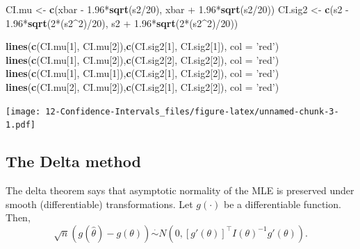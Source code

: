 \documentclass[]{book}
\newenvironment{Shaded}{\begin{snugshade}}{\end{snugshade}}
\newcommand{\KeywordTok}[1]{\textcolor[rgb]{0.13,0.29,0.53}{\textbf{{#1}}}}
\newcommand{\DataTypeTok}[1]{\textcolor[rgb]{0.13,0.29,0.53}{{#1}}}
\newcommand{\DecValTok}[1]{\textcolor[rgb]{0.00,0.00,0.81}{{#1}}}
\newcommand{\FloatTok}[1]{\textcolor[rgb]{0.00,0.00,0.81}{{#1}}}
\newcommand{\StringTok}[1]{\textcolor[rgb]{0.31,0.60,0.02}{{#1}}}
\newcommand{\NormalTok}[1]{{#1}}
\begin{document}
\begin{Shaded}
\begin{Highlighting}[]
\NormalTok{CI.mu <-}\StringTok{ }\KeywordTok{c}\NormalTok{(xbar -}\StringTok{ }\FloatTok{1.96}\NormalTok{*}\KeywordTok{sqrt}\NormalTok{(s2/}\DecValTok{20}\NormalTok{), xbar +}\StringTok{ }\FloatTok{1.96}\NormalTok{*}\KeywordTok{sqrt}\NormalTok{(s2/}\DecValTok{20}\NormalTok{))}
\NormalTok{CI.sig2 <-}\StringTok{ }\KeywordTok{c}\NormalTok{(s2 -}\StringTok{ }\FloatTok{1.96}\NormalTok{*}\KeywordTok{sqrt}\NormalTok{(}\DecValTok{2}\NormalTok{*(s2^}\DecValTok{2}\NormalTok{)/}\DecValTok{20}\NormalTok{), s2 +}\StringTok{ }\FloatTok{1.96}\NormalTok{*}\KeywordTok{sqrt}\NormalTok{(}\DecValTok{2}\NormalTok{*(s2^}\DecValTok{2}\NormalTok{)/}\DecValTok{20}\NormalTok{))}

\KeywordTok{lines}\NormalTok{(}\KeywordTok{c}\NormalTok{(CI.mu[}\DecValTok{1}\NormalTok{], CI.mu[}\DecValTok{2}\NormalTok{]),}\KeywordTok{c}\NormalTok{(CI.sig2[}\DecValTok{1}\NormalTok{], CI.sig2[}\DecValTok{1}\NormalTok{]), }\DataTypeTok{col =} \StringTok{'red'}\NormalTok{) }
\KeywordTok{lines}\NormalTok{(}\KeywordTok{c}\NormalTok{(CI.mu[}\DecValTok{1}\NormalTok{], CI.mu[}\DecValTok{2}\NormalTok{]),}\KeywordTok{c}\NormalTok{(CI.sig2[}\DecValTok{2}\NormalTok{], CI.sig2[}\DecValTok{2}\NormalTok{]), }\DataTypeTok{col =} \StringTok{'red'}\NormalTok{) }
\KeywordTok{lines}\NormalTok{(}\KeywordTok{c}\NormalTok{(CI.mu[}\DecValTok{1}\NormalTok{], CI.mu[}\DecValTok{1}\NormalTok{]),}\KeywordTok{c}\NormalTok{(CI.sig2[}\DecValTok{1}\NormalTok{], CI.sig2[}\DecValTok{2}\NormalTok{]), }\DataTypeTok{col =} \StringTok{'red'}\NormalTok{) }
\KeywordTok{lines}\NormalTok{(}\KeywordTok{c}\NormalTok{(CI.mu[}\DecValTok{2}\NormalTok{], CI.mu[}\DecValTok{2}\NormalTok{]),}\KeywordTok{c}\NormalTok{(CI.sig2[}\DecValTok{1}\NormalTok{], CI.sig2[}\DecValTok{2}\NormalTok{]), }\DataTypeTok{col =} \StringTok{'red'}\NormalTok{) }
\end{Highlighting}
\end{Shaded}

\texttt{[image: 12-Confidence-Intervals\_files/figure-latex/unnamed-chunk-3-1.pdf]}

\subsection{The Delta method}\label{the-delta-method}

The delta theorem says that asymptotic normality of the MLE is preserved
under smooth (differentiable) transformations. Let \(g(\cdot)\) be a
differentiable function. Then,
\[\sqrt{n}(g(\hat\theta) - g(\theta))\stackrel{\cdot}{\sim} N\left(0, [g'(\theta)]^\top I(\theta)^{-1}g'(\theta)\right).\]
\end{document}
